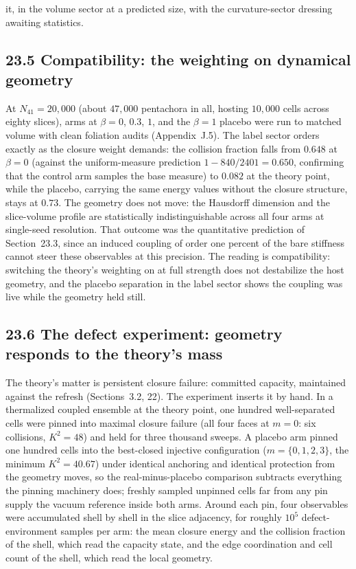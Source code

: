 \documentclass[11pt]{article}
\begin{document}
it, in the volume sector at a predicted size, with the curvature-sector dressing awaiting statistics.

\subsection{23.5 Compatibility: the weighting on dynamical geometry}

At $N_{41}=20{,}000$ (about $47{,}000$ pentachora in all, hosting $10{,}000$ cells across eighty slices), arms at $\beta=0$, $0.3$, $1$, and the $\beta=1$ placebo were run to matched volume with clean foliation audits (Appendix~J.5). The label sector orders exactly as the closure weight demands: the collision fraction falls from $0.648$ at $\beta=0$ (against the uniform-measure prediction $1-840/2401=0.650$, confirming that the control arm samples the base measure) to $0.082$ at the theory point, while the placebo, carrying the same energy values without the closure structure, stays at $0.73$. The geometry does not move: the Hausdorff dimension and the slice-volume profile are statistically indistinguishable across all four arms at single-seed resolution. That outcome was the quantitative prediction of Section~23.3, since an induced coupling of order one percent of the bare stiffness cannot steer these observables at this precision. The reading is compatibility: switching the theory's weighting on at full strength does not destabilize the host geometry, and the placebo separation in the label sector shows the coupling was live while the geometry held still.

\subsection{23.6 The defect experiment: geometry responds to the theory's mass}

The theory's matter is persistent closure failure: committed capacity, maintained against the refresh (Sections~3.2, 22). The experiment inserts it by hand. In a thermalized coupled ensemble at the theory point, one hundred well-separated cells were pinned into maximal closure failure (all four faces at $m=0$: six collisions, $K^2=48$) and held for three thousand sweeps. A placebo arm pinned one hundred cells into the best-closed injective configuration ($m=\{0,1,2,3\}$, the minimum $K^2=40.67$) under identical anchoring and identical protection from the geometry moves, so the real-minus-placebo comparison subtracts everything the pinning machinery does; freshly sampled unpinned cells far from any pin supply the vacuum reference inside both arms. Around each pin, four observables were accumulated shell by shell in the slice adjacency, for roughly $10^5$ defect-environment samples per arm: the mean closure energy and the collision fraction of the shell, which read the capacity state, and the edge coordination and cell count of the shell, which read the local geometry.
\end{document}
